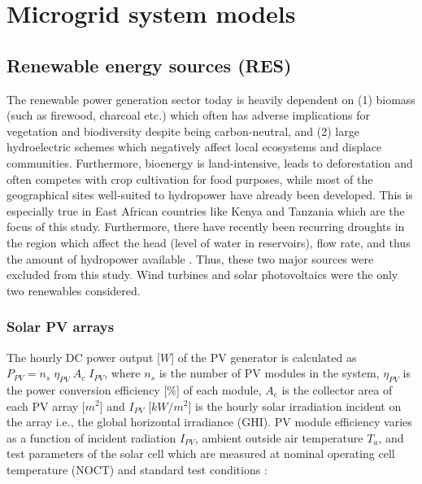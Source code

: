 \documentclass[final,3p,times]{elsarticle}
\begin{document}
\newpage

\appendix
{}

\section{Microgrid system models \label{app:mg_models}}

\subsection{Renewable energy sources (RES)}

The renewable power generation sector today is heavily dependent on (1) biomass (such as firewood, charcoal etc.) which often has adverse implications for vegetation and biodiversity despite being carbon-neutral, and (2) large hydroelectric schemes which negatively affect local ecosystems and displace communities. Furthermore, bioenergy is land-intensive, leads to deforestation and often competes with crop cultivation for food purposes, while most of the geographical sites well-suited to hydropower have already been developed. This is especially true in East African countries like Kenya and Tanzania which are the focus of this study. Furthermore, there have recently been recurring droughts in the region which affect the head (level of water in reservoirs), flow rate, and thus the amount of hydropower available \cite{usea}. Thus, these two major sources were excluded from this study. Wind turbines and solar photovoltaics were the only two renewables considered. 

\subsubsection{Solar PV arrays}

The hourly DC power output [$W$] of the PV generator is calculated as $P_{PV} = n_s \; \eta_{PV} \; A_c \; I_{PV} $\cite{tazvinga2013}, where $n_s$ is the number of PV modules in the system, $\eta_{PV}$ is the power conversion efficiency [\%] of each module, $A_c$ is the collector area of each PV array [$m^2$] and $I_{PV}$ [$kW/m^2$] is the hourly solar irradiation incident on the array i.e., the global horizontal irradiance (GHI). PV module efficiency varies as a function of incident radiation $I_{PV}$, ambient outside air temperature $T_a$, and test parameters of the solar cell which are measured at nominal operating cell temperature (NOCT) and standard test conditions \cite{tazvinga2013}:
\end{document}
